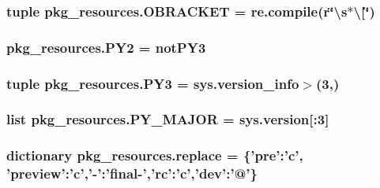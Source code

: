 \subsubsection[{O\+B\+R\+A\+C\+K\+E\+T}]{\setlength{\rightskip}{0pt plus 5cm}tuple pkg\+\_\+resources.\+O\+B\+R\+A\+C\+K\+E\+T = re.\+compile({\bf r}\char`\"{}\textbackslash{}s$\ast$\textbackslash{}\mbox{[}\char`\"{})}\label{namespacepkg__resources_a47cc940535c52e3219e4f740dde2e617}
\hypertarget{namespacepkg__resources_a3b9bf3a3274fead6d2bebfeaf324ade8}{}
\subsubsection[{P\+Y2}]{\setlength{\rightskip}{0pt plus 5cm}pkg\+\_\+resources.\+P\+Y2 = not\+P\+Y3}\label{namespacepkg__resources_a3b9bf3a3274fead6d2bebfeaf324ade8}
\hypertarget{namespacepkg__resources_a9178a93fe70a0df259673cb208f11462}{}
\subsubsection[{P\+Y3}]{\setlength{\rightskip}{0pt plus 5cm}tuple pkg\+\_\+resources.\+P\+Y3 = sys.\+version\+\_\+info$>$(3,)}\label{namespacepkg__resources_a9178a93fe70a0df259673cb208f11462}
\hypertarget{namespacepkg__resources_a0b3b152e2167baf5127f1f1d40d9bbbe}{}
\subsubsection[{P\+Y\+\_\+\+M\+A\+J\+O\+R}]{\setlength{\rightskip}{0pt plus 5cm}list pkg\+\_\+resources.\+P\+Y\+\_\+\+M\+A\+J\+O\+R = {\bf sys.\+version}\mbox{[}\+:3\mbox{]}}\label{namespacepkg__resources_a0b3b152e2167baf5127f1f1d40d9bbbe}
\hypertarget{namespacepkg__resources_a4ed2ad35ad4aae95de76204e256404ab}{}
\subsubsection[{replace}]{\setlength{\rightskip}{0pt plus 5cm}dictionary pkg\+\_\+resources.\+replace = \{'pre'\+:'c', 'preview'\+:'c','-\/'\+:'final-\/','rc'\+:'c','dev'\+:'@'\}}\label{namespacepkg__resources_a4ed2ad35ad4aae95de76204e256404ab}
\hypertarget{namespacepkg__resources_a4b0ffc0687f16fe370416cea417a456f}{}
